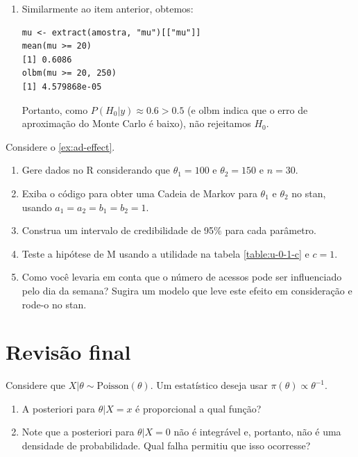 {\begin{enumerate}[label=(\alph*)]
  \item Similarmente ao item anterior, obtemos:
	\begin{verbatim}
mu <- extract(amostra, "mu")[["mu"]]
mean(mu >= 20)
[1] 0.6086
olbm(mu >= 20, 250)
[1] 4.579868e-05
	\end{verbatim}
	Portanto, como $P(H_{0}|y) \approx 0.6 > 0.5$
	(e olbm indica que o erro de aproximação do
	 Monte Carlo é baixo),
	não rejeitamos $H_{0}$.
 \end{enumerate}
}{}

\begin{exercise}
 Considere o \cref{ex:ad-effect}.
 \begin{enumerate}[label=(\alph*)]
  \item Gere dados no R considerando que $\theta_{1}=100$ e $\theta_{2}=150$ e $n=30$.
	\item Exiba o código para obter uma Cadeia de Markov para $\theta_{1}$ e $\theta_{2}$ no stan, usando $a_1 = a_2 = b_1 = b_2 = 1$.
	\item Construa um intervalo de credibilidade de 95\% para cada parâmetro.
	\item Teste a hipótese de M usando a utilidade na tabela \ref{table:u-0-1-c} e $c=1$.
	\item Como você levaria em conta que o número de acessos pode ser influenciado pelo dia da semana?
	      Sugira um modelo que leve este efeito em consideração e rode-o no stan.
 \end{enumerate}
\end{exercise}


\section{Revisão final}

\begin{exercise}
 Considere que $X|\theta \sim \text{Poisson}(\theta)$.
 Um estatístico deseja usar $\pi(\theta) \propto \theta^{-1}$.
 \begin{enumerate}[label=(\alph*)]
  \item A posteriori para $\theta|X=x$ é proporcional a qual função?
	\item Note que a posteriori para $\theta|X=0$ não é integrável e,
	      portanto, não é uma densidade de probabilidade.
				Qual falha permitiu que isso ocorresse?
 \end{enumerate}
\end{exercise}





